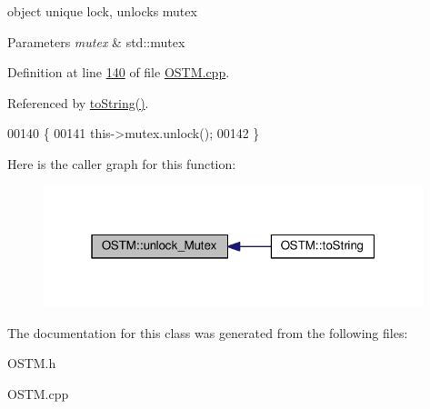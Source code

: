 object unique lock, unlocks mutex 


\begin{DoxyParams}{Parameters}
{\em mutex} & std\+::mutex \\
\hline
\end{DoxyParams}


Definition at line \hyperlink{_o_s_t_m_8cpp_source_l00140}{140} of file \hyperlink{_o_s_t_m_8cpp_source}{O\+S\+T\+M.\+cpp}.



Referenced by \hyperlink{_o_s_t_m_8h_source_l00042}{to\+String()}.


\begin{DoxyCode}
00140                         \{
00141     this->mutex.unlock();
00142 \}
\end{DoxyCode}


Here is the caller graph for this function\+:\nopagebreak
\begin{figure}[H]
\begin{center}
\leavevmode
\includegraphics[width=313pt]{class_o_s_t_m_a6cd703bc26c719fd95b4f5362d050762_icgraph}
\end{center}
\end{figure}




The documentation for this class was generated from the following files\+:\begin{DoxyCompactItemize}
\item 
O\+S\+T\+M.\+h\item 
O\+S\+T\+M.\+cpp\end{DoxyCompactItemize}
